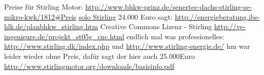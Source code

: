 \documentclass[fontsize=10pt,paper=a4,bibliography=totoc]{scrartcl}
\begin{document}
Preise für Stirling Motor:
\url{http://www.bhkw-prinz.de/senertec-dachs-stirling-se-mikro-kwk/1812#Preis}
\url{solo Stirling}
24.000 Euro sagt:
\url{http://energieberatung.ibs-hlk.de/planbhkw_stirling.htm}
Creative Commons Lizenz - Stirling
\url{http://ve-ingenieure.de/projekt_st05g_cnc.html}
endlich mal was professionelles:
\url{http://www.stirling.dk/index.php} und \url{http://www.stirling-energie.de/}
hm war leider wieder ohne Preis, dafür sagt der hier auch 25.000Euro
\url{http://www.stirlingmotor.org/downloads/basisinfo.pdf}
\end{document}
